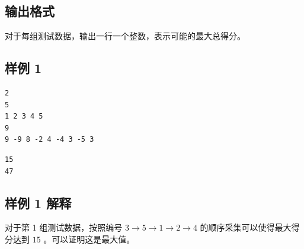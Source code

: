 \subsection{输出格式}

对于每组测试数据，输出一行一个整数，表示可能的最大总得分。

\subsection{样例 1}

\begin{minipage}{\linewidth}
	\begin{minipage}[t]{0.49\linewidth}
		\begin{lstlisting}[title=\texttt{standard input}]
2
5
1 2 3 4 5
9
9 -9 8 -2 4 -4 3 -5 3
\end{lstlisting}
	\end{minipage}
	\begin{minipage}[t]{0.49\linewidth}
		\begin{lstlisting}[title=\texttt{standard output}]
15
47
\end{lstlisting}
	\end{minipage}
\end{minipage}

\subsection{样例 1 解释}

对于第 1 组测试数据，按照编号 $3 \to 5\to 1\to 2\to 4$ 的顺序采集可以使得最大得分达到 $15$ 。可以证明这是最大值。

